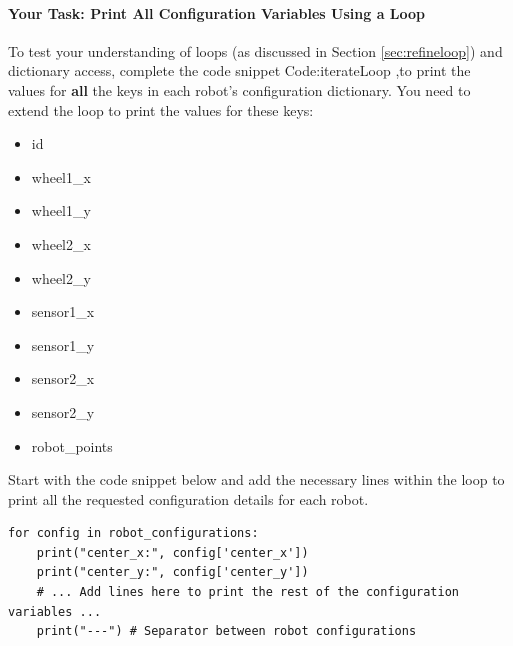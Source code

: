 \paragraph{Your Task: Print All Configuration Variables Using a Loop}
\label{sec:print_all_config}
To test your understanding of loops (as discussed in Section \ref{sec:refineloop}) and dictionary access, complete the code snippet  Code:iterateLoop ,to print the values for \textbf{all} the keys in each robot's configuration dictionary. You need to extend the loop to print the values for these keys:

\begin{itemize}\setlength{\itemsep}{0pt}
    \item id
    \item wheel1\_x
    \item wheel1\_y
    \item wheel2\_x
    \item wheel2\_y
    \item sensor1\_x
    \item sensor1\_y
    \item sensor2\_x
    \item sensor2\_y
    \item  robot\_points
\end{itemize}


Start with the code snippet below and add the necessary lines within the loop to print all the requested configuration details for each robot.

\begin{verbatim}
for config in robot_configurations:
    print("center_x:", config['center_x'])
    print("center_y:", config['center_y'])
    # ... Add lines here to print the rest of the configuration variables ...
    print("---") # Separator between robot configurations
\end{verbatim}




